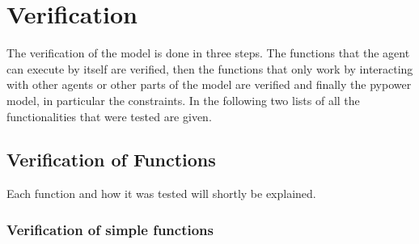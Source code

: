 \documentclass[a4paper]{article}
\begin{document}
\section{Verification}
The verification of the model is done in three steps. The functions that the agent can execute by itself
are verified, then the functions that only work by interacting with other agents or other parts of the
model are verified and finally the pypower model, in particular the constraints. 
In the following two lists of all the functionalities that were tested are given.
\subsection{Verification of Functions}
Each function and how it was tested will shortly be explained. 
\subsubsection{Verification of simple functions}
\end{document}
